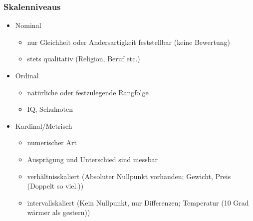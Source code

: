 \documentclass[a4paper]{article}
\begin{document}
\begin{landscape}
\begin{multicols}{4}
    \subsubsection*{Skalenniveaus}
    \begin{itemize}[noitemsep,nolistsep,leftmargin=*]
        \item Nominal
        \begin{itemize}[noitemsep,nolistsep,leftmargin=*]
            \item nur Gleichheit oder Andersartigkeit feststellbar (keine Bewertung)
            \item stets qualitativ (Religion, Beruf etc.)
        \end{itemize}
        \item Ordinal
        \begin{itemize}[noitemsep,nolistsep,leftmargin=*]
            \item natürliche oder festzulegende Rangfolge
            \item IQ, Schulnoten
        \end{itemize}
        \item Kardinal/Metrisch
        \begin{itemize}[noitemsep,nolistsep,leftmargin=*]
            \item numerischer Art 
            \item Ausprägung und Unterschied sind messbar
            \item verhältnisskaliert (Absoluter Nullpunkt vorhanden; Gewicht, Preis (Doppelt so viel.))
            \item intervallskaliert (Kein Nullpunkt, nur Differenzen; Temperatur (10 Grad wärmer als gestern))
        \end{itemize}
    \end{itemize}

\end{multicols}
\end{landscape}
\end{document}
